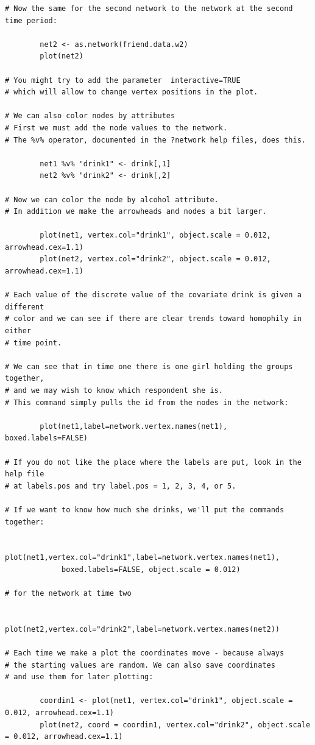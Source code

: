 \documentclass[a4paper,fleqn]{article}
\newcommand{\+}{\, + \,}
\begin{document}
{\begin{verbatim}
# Now the same for the second network to the network at the second time period:

        net2 <- as.network(friend.data.w2)
        plot(net2)

# You might try to add the parameter  interactive=TRUE
# which will allow to change vertex positions in the plot.

# We can also color nodes by attributes
# First we must add the node values to the network.
# The %v% operator, documented in the ?network help files, does this.

        net1 %v% "drink1" <- drink[,1]
        net2 %v% "drink2" <- drink[,2]

# Now we can color the node by alcohol attribute.
# In addition we make the arrowheads and nodes a bit larger.

        plot(net1, vertex.col="drink1", object.scale = 0.012, arrowhead.cex=1.1)
        plot(net2, vertex.col="drink2", object.scale = 0.012, arrowhead.cex=1.1)

# Each value of the discrete value of the covariate drink is given a different
# color and we can see if there are clear trends toward homophily in either
# time point.

# We can see that in time one there is one girl holding the groups together,
# and we may wish to know which respondent she is.
# This command simply pulls the id from the nodes in the network:

        plot(net1,label=network.vertex.names(net1), boxed.labels=FALSE)

# If you do not like the place where the labels are put, look in the help file
# at labels.pos and try label.pos = 1, 2, 3, 4, or 5.

# If we want to know how much she drinks, we'll put the commands together:

        plot(net1,vertex.col="drink1",label=network.vertex.names(net1),
             boxed.labels=FALSE, object.scale = 0.012)

# for the network at time two

        plot(net2,vertex.col="drink2",label=network.vertex.names(net2))

# Each time we make a plot the coordinates move - because always
# the starting values are random. We can also save coordinates
# and use them for later plotting:

        coordin1 <- plot(net1, vertex.col="drink1", object.scale = 0.012, arrowhead.cex=1.1)
        plot(net2, coord = coordin1, vertex.col="drink2", object.scale = 0.012, arrowhead.cex=1.1)


\end{verbatim}}
\end{document}
